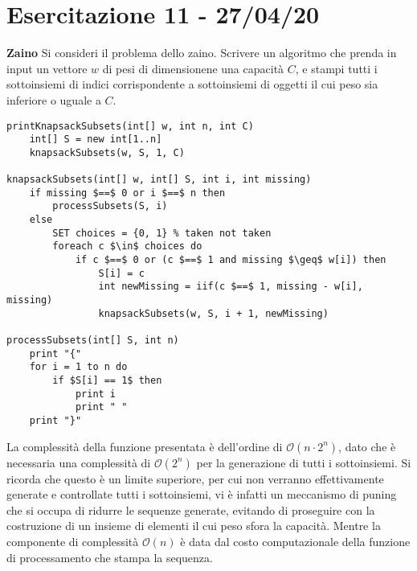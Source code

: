 \documentclass[../cheatSheetAlgoritmi.tex]{subfiles}
\begin{document}
\section{Esercitazione 11 - 27/04/20}
\textbf{Zaino}
Si consideri il problema dello zaino. Scrivere un algoritmo che prenda in input un vettore $w$ di pesi di dimensionene una capacità $C$, e stampi tutti i sottoinsiemi di indici corrispondente a sottoinsiemi di oggetti il cui peso sia inferiore o uguale a $C$.
\begin{lstlisting}[caption=Stampa i subsets di Knapsack]
printKnapsackSubsets(int[] w, int n, int C)
    int[] S = new int[1..n]
    knapsackSubsets(w, S, 1, C)

knapsackSubsets(int[] w, int[] S, int i, int missing)
    if missing $==$ 0 or i $==$ n then
        processSubsets(S, i)
    else 
        SET choices = {0, 1} % taken not taken
        foreach c $\in$ choices do
            if c $==$ 0 or (c $==$ 1 and missing $\geq$ w[i]) then
                S[i] = c
                int newMissing = iif(c $==$ 1, missing - w[i], missing)
                knapsackSubsets(w, S, i + 1, newMissing)
                
processSubsets(int[] S, int n) 
    print "{"
    for i = 1 to n do
        if $S[i] == 1$ then
            print i
            print " "
    print "}"
\end{lstlisting}
La complessità della funzione presentata è dell'ordine di $\mathcal{O}(n \cdot 2^n)$, dato che è necessaria una complessità di $\mathcal{O}(2^n)$ per la generazione di tutti i sottoinsiemi. Si ricorda che questo è un limite superiore, per cui non verranno effettivamente generate e controllate tutti i sottoinsiemi, vi è infatti un meccanismo di puning che si occupa di ridurre le sequenze generate, evitando di proseguire con la costruzione di un insieme di elementi il cui peso sfora la capacità. Mentre la componente di complessità $\mathcal{O}(n)$ è data dal costo computazionale della funzione di processamento che stampa la sequenza.
\end{document}
